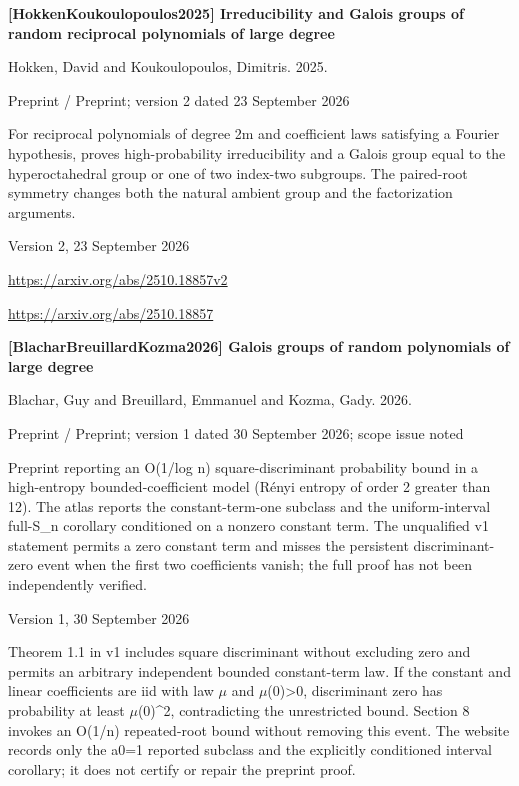 \documentclass[11pt,a4paper,oneside,openany]{book}
\begin{document}
\vspace{9pt}
\hypertarget{ref:HokkenKoukoulopoulos2025}{}
{\sffamily\bfseries\color{atlasgreen}[HokkenKoukoulopoulos2025] Irreducibility and Galois groups of random reciprocal polynomials of large degree}\par
\color{black} Hokken, David and Koukoulopoulos, Dimitris. 2025.\par
{\small\sffamily\color{atlasgold}Preprint / Preprint; version 2 dated 23 September 2026}\par
\color{black} For reciprocal polynomials of degree 2m and coefficient laws satisfying a Fourier hypothesis, proves high-probability irreducibility and a Galois group equal to the hyperoctahedral group or one of two index-two subgroups. The paired-root symmetry changes both the natural ambient group and the factorization arguments.\par
{\small Version 2, 23 September 2026}\par
{\footnotesize\url{https://arxiv.org/abs/2510.18857v2}}\par
{\footnotesize\url{https://arxiv.org/abs/2510.18857}}\par
\vspace{9pt}
\hypertarget{ref:BlacharBreuillardKozma2026}{}
{\sffamily\bfseries\color{atlasgreen}[BlacharBreuillardKozma2026] Galois groups of random polynomials of large degree}\par
\color{black} Blachar, Guy and Breuillard, Emmanuel and Kozma, Gady. 2026.\par
{\small\sffamily\color{atlasgold}Preprint / Preprint; version 1 dated 30 September 2026; scope issue noted}\par
\color{black} Preprint reporting an O(1/log n) square-discriminant probability bound in a high-entropy bounded-coefficient model (Rényi entropy of order 2 greater than 12). The atlas reports the constant-term-one subclass and the uniform-interval full-S\_\allowbreak{}n corollary conditioned on a nonzero constant term. The unqualified v1 statement permits a zero constant term and misses the persistent discriminant-zero event when the first two coefficients vanish; the full proof has not been independently verified.\par
{\small Version 1, 30 September 2026}\par
{\small Theorem 1.1 in v1 includes square discriminant without excluding zero and permits an arbitrary independent bounded constant-term law. If the constant and linear coefficients are iid with law \ensuremath{\mu} and \ensuremath{\mu}(0)>0, discriminant zero has probability at least \ensuremath{\mu}(0)\textasciicircum{}2, contradicting the unrestricted bound. Section 8 invokes an O(1/n) repeated-root bound without removing this event. The website records only the a0=1 reported subclass and the explicitly conditioned interval corollary; it does not certify or repair the preprint proof.}\par
\end{document}
